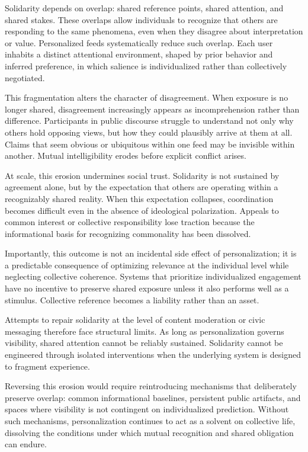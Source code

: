 \documentclass[12pt]{article}
\begin{document}
Solidarity depends on overlap: shared reference points, shared attention, and shared stakes. These overlaps allow individuals to recognize that others are responding to the same phenomena, even when they disagree about interpretation or value. Personalized feeds systematically reduce such overlap. Each user inhabits a distinct attentional environment, shaped by prior behavior and inferred preference, in which salience is individualized rather than collectively negotiated.

This fragmentation alters the character of disagreement. When exposure is no longer shared, disagreement increasingly appears as incomprehension rather than difference. Participants in public discourse struggle to understand not only why others hold opposing views, but how they could plausibly arrive at them at all. Claims that seem obvious or ubiquitous within one feed may be invisible within another. Mutual intelligibility erodes before explicit conflict arises.

At scale, this erosion undermines social trust. Solidarity is not sustained by agreement alone, but by the expectation that others are operating within a recognizably shared reality. When this expectation collapses, coordination becomes difficult even in the absence of ideological polarization. Appeals to common interest or collective responsibility lose traction because the informational basis for recognizing commonality has been dissolved.

Importantly, this outcome is not an incidental side effect of personalization; it is a predictable consequence of optimizing relevance at the individual level while neglecting collective coherence. Systems that prioritize individualized engagement have no incentive to preserve shared exposure unless it also performs well as a stimulus. Collective reference becomes a liability rather than an asset.

Attempts to repair solidarity at the level of content moderation or civic messaging therefore face structural limits. As long as personalization governs visibility, shared attention cannot be reliably sustained. Solidarity cannot be engineered through isolated interventions when the underlying system is designed to fragment experience.

Reversing this erosion would require reintroducing mechanisms that deliberately preserve overlap: common informational baselines, persistent public artifacts, and spaces where visibility is not contingent on individualized prediction. Without such mechanisms, personalization continues to act as a solvent on collective life, dissolving the conditions under which mutual recognition and shared obligation can endure.
\end{document}
